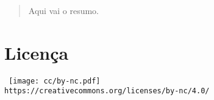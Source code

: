 \thispagestyle{empty} %
\flushbottom %
\maketitle %


\begin{abstract}
    Aqui vai o resumo.
\end{abstract}


\section*{Licença}

    \scriptsize\noindent%
    \begin{minipage}{\columnwidth}
        \centering\tt
        \texttt{[image: cc/by-nc.pdf]}\\[0.5\smallskipamount]
        {\scriptsize\texttt{https://creativecommons.org/licenses/by-nc/4.0/}}
    \end{minipage}
    \normalsize


\tableofcontents


